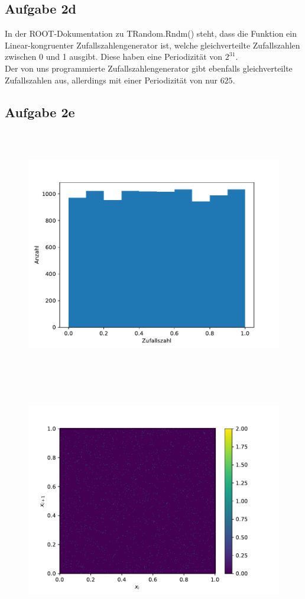 \subsection*{Aufgabe 2d}
In der ROOT-Dokumentation zu TRandom.Rndm() steht, dass die Funktion ein Linear-kongruenter Zufallszahlengenerator ist, welche gleichverteilte Zufallszahlen zwischen 0 und 1 ausgibt. Diese haben eine Periodizität von $2^{31}$. \\
Der von uns programmierte Zufallszahlengenerator gibt ebenfalls gleichverteilte Zufallszahlen aus, allerdings mit einer Periodizität von nur $625$.

\subsection*{Aufgabe 2e}
\begin{figure}[H]
  \includegraphics[height=11cm]{Python/Aufgabe2e1.pdf}
\end{figure}
\begin{figure}[H]
  \includegraphics[height=10cm]{Python/Aufgabe2e2.pdf}
\end{figure}
